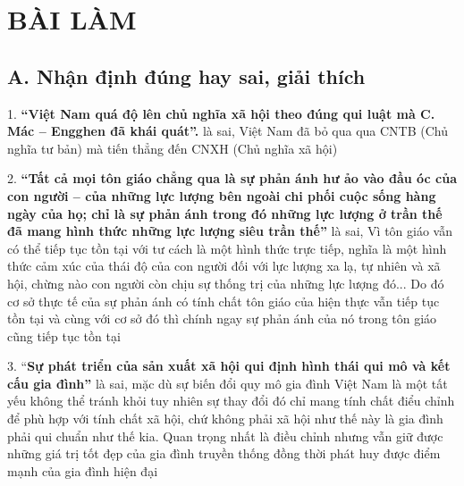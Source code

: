 \section*{BÀI LÀM}
\setcounter{section}{2}
\subsection*{\textbf{\fontsize{16pt}{0pt}\selectfont A. Nhận định đúng hay sai, giải thích}}

1. \textbf{“Việt Nam quá độ lên chủ nghĩa xã hội theo đúng qui luật mà C. Mác – Engghen đã khái quát”.} là sai, Việt Nam đã bỏ qua qua CNTB (Chủ nghĩa tư bản) mà tiến thẳng đến CNXH (Chủ nghĩa xã hội) 

2. \textbf{“Tất cả mọi tôn giáo chẳng qua là sự phản ánh hư ảo vào đầu óc của con người – của những lực lượng bên ngoài chi phối cuộc sống hàng ngày của họ; chỉ là sự phản ánh trong đó những lực lượng ở trần thế đã mang hình thức những lực lượng siêu trần thế”} là sai, Vì tôn giáo vẫn có thể tiếp tục tồn tại với tư cách là một hình thức trực tiếp, nghĩa là một hình thức cảm xúc của thái độ của con người đối với lực lượng xa lạ, tự nhiên và xã hội, chừng nào con người còn chịu sự thống trị của những lực lượng đó... Do đó cơ sở thực tế của sự phản ánh có tính chất tôn giáo của hiện thực vẫn tiếp tục tồn tại và cùng với cơ sở đó thì chính ngay sự phản ánh của nó trong tôn giáo cũng tiếp tục tồn tại

3. “\textbf{Sự phát triển của sản xuất xã hội qui định hình thái qui mô và kết cấu gia đình”} là sai, mặc dù sự biến đổi quy mô gia đình Việt Nam là một tất yếu không thể tránh khỏi tuy nhiên sự thay đổi đó chỉ mang tính chất điểu chỉnh để phù hợp với tính chất xã hội, chứ không phải xã hội như thế này là gia đình phải qui chuẩn như thế kia. Quan trọng nhất là điều chỉnh nhưng vẫn giữ được những giá trị tốt đẹp của gia đình truyền thống đồng thời phát huy được điểm mạnh của gia đình hiện đại
